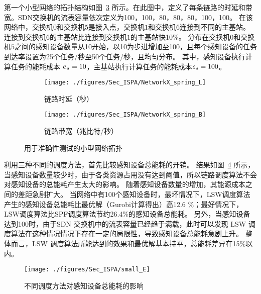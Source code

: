 第一个小型网络的拓扑结构如图~\ref{fig_smallNetwork} 所示。在此图中，定义了每条链路的时延和带宽。SDN交换机的流表容量依次定义为100，100，80，80，80，100，100。
在该网络中，交换机$0$和交换机$5$是接入点，交换机$1$和交换机$6$连接到不同的主基站。
连接到交换机$6$的主基站比连接到交换机$1$的主基站快10\%。
分布在交换机$0$和交换机$5$之间的感知设备数量从10开始，以10为步进增加至100，且每个感知设备的任务到达率设置为25个任务/秒至50个任务/秒，且均匀分布。
其中，感知设备执行计算任务的能耗成本 $e_u=10$，主基站执行计算任务的能耗成本$e_s=100$。

\begin{figure}[!h]
  \centering
  \begin{subfigure}[b]{0.45\linewidth}
    \texttt{[image: ./figures/Sec\_ISPA/NetworkX\_spring\_L]}
    \label{fig_smallNetworkL}
    \caption{链路时延（秒）}
  \end{subfigure} %
  \begin{subfigure}[b]{0.45\linewidth}    
    \texttt{[image: ./figures/Sec\_ISPA/NetworkX\_spring\_B]}
    \label{fig_smallNetworkB}
    \caption{链路带宽（兆比特/秒）}
  \end{subfigure} 
  \caption{用于准确性测试的小型网络拓扑}
  \label{fig_smallNetwork}
\end{figure}

利用三种不同的调度方法，首先比较感知设备总能耗的开销。
结果如图~\ref{fig_smallE} 所示，当感知设备数量较少时，由于各类资源占用没有达到阈值，所以链路调度算法不会对感知设备的总能耗产生太大的影响。
随着感知设备数量的增加，其能源成本之间的差距急剧扩大。
当网络中有100个感知设备时，最坏情况下，LSW调度算法产生的感知设备总能耗比最优解（Gurobi计算得出）高12.6 \%；最好情况下，LSW调度算法比SPF调度算法节约26.4\%的感知设备总能耗。
另外，当感知设备达到100时，由于SDN 交换机中的流表容量已经趋于满载，此时可以发现 LSW 调度算法在这种情况情况下存在一定的局限性，导致感知设备总能耗急剧上升。
整体而言，LSW 调度算法所能达到的效果和最优解基本持平，总能耗差异在15\%以内。

\begin{figure}[!h]
  \centering
  \texttt{[image: ./figures/Sec\_ISPA/small\_E]}
  \vspace{-1em}
  \caption{不同调度方法对感知设备总能耗的影响}
  \label{fig_smallE}
\end{figure}



